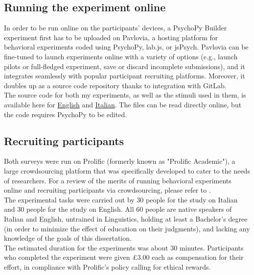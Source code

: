 \subsection{Running the experiment online} 
In order to be run online on the participants' devices, a PsychoPy Builder experiment first has to be uploaded on Pavlovia, a hosting platform for behavioral experiments coded using PsychoPy, lab.js, or jsPsych. Pavlovia can be fine-tuned to launch experiments online with a variety of options (e.g., launch pilots or full-fledged experiment, save or discard incomplete submissions), and it integrates seamlessly with popular participant recruiting platforms. Moreover, it doubles up as a source code repository thanks to integration with GitLab.\\
The source code for both my experiments, as well as the stimuli used in them, is available here for \href{https://github.com/giuliacappelli/psychopy_exps/tree/main/eng}{English} and \href{https://github.com/giuliacappelli/psychopy_exps/tree/main/ita}{Italian}. The files can be read directly online, but the code requires PsychoPy to be edited.

\subsection{Recruiting participants} 
Both surveys were run on Prolific (formerly known as "Prolific Academic"), a large crowdsourcing platform that was specifically developed to cater to the needs of researchers. For a review of the merits of running behavioral experiments online and recruiting participants via crowdsourcing, please refer to \textcite{GibsonPiantadosiFedorenko2011, grootswagers2020primer, ErlewineKotek2016}.\\
The experimental tasks were carried out by 30 people for the study on Italian and 30 people for the study on English. All 60 people are native speakers of Italian and English, untrained in Linguistics, holding at least a Bachelor's degree (in order to minimize the effect of education on their judgments), and lacking any knowledge of the goals of this dissertation.\\
The estimated duration for the experiments was about 30 minutes. Participants who completed the experiment were given £3.00 each as compensation for their effort, in compliance with Prolific's policy calling for ethical rewards.


